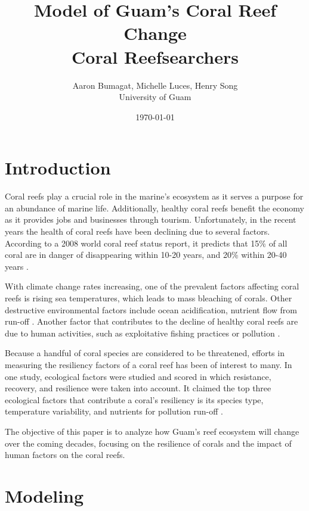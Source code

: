 \documentclass[12pt]{article}
\title{Model of Guam's Coral Reef Change\\Coral Reefsearchers}
\author{Aaron Bumagat, Michelle Luces, Henry Song\\University of Guam}
\date{\today}
\begin{document}
\maketitle

\section{Introduction}
Coral reefs play a crucial role in the marine's ecosystem as it serves a purpose for an abundance of marine life. Additionally, healthy coral reefs benefit the economy as it provides jobs and businesses through tourism. Unfortunately, in the recent years the health of coral reefs have been declining due to several factors. According to a 2008 world coral reef status report, it predicts that 15\% of all coral are in danger of disappearing within 10-20 years, and 20\% within 20-40 years \cite{05_quintero_machuca_cotto_bradley_ríos-soto_2016}. 

With climate change rates increasing, one of the prevalent factors affecting coral reefs is rising sea temperatures, which leads to mass bleaching of corals. Other destructive environmental factors include ocean acidification, nutrient flow from run-off \cite{05_quintero_machuca_cotto_bradley_ríos-soto_2016}. Another factor that contributes to the decline of healthy coral reefs are due to human activities, such as exploitative fishing practices or pollution \cite{04_mathanalysis}. 

Because a handful of coral species are considered to be threatened, efforts in measuring the resiliency factors of a coral reef has been of interest to many. In one study, ecological factors were studied and scored in which resistance, recovery, and resilience were taken into account. It claimed the top three ecological factors that contribute a coral's resiliency is its species type, temperature variability, and nutrients for pollution run-off \cite{02_Riegl_Purkis_Model}. 

The objective of this paper is to analyze how Guam's reef ecosystem will change over the coming decades, focusing on the resilience of corals and the impact of human factors on the coral reefs. 



\section{Modeling}
\end{document}
